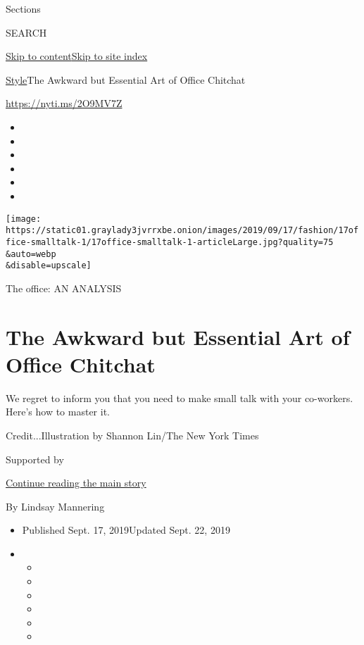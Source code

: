 Sections

SEARCH

\protect\hyperlink{site-content}{Skip to
content}\protect\hyperlink{site-index}{Skip to site index}

\href{/section/style}{Style}\textbar{}The Awkward but Essential Art of
Office Chitchat

\url{https://nyti.ms/2O9MV7Z}

\begin{itemize}
\item
\item
\item
\item
\item
\item
\end{itemize}

\texttt{[image: https://static01.graylady3jvrrxbe.onion/images/2019/09/17/fashion/17office-smalltalk-1/17office-smalltalk-1-articleLarge.jpg?quality=75\\\&auto=webp\\\&disable=upscale]}

The office: AN ANALYSIS

\hypertarget{the-awkward-but-essential-art-of-office-chitchat}{%
\section{The Awkward but Essential Art of Office
Chitchat}\label{the-awkward-but-essential-art-of-office-chitchat}}

We regret to inform you that you need to make small talk with your
co-workers. Here's how to master it.

Credit...Illustration by Shannon Lin/The New York Times

Supported by

\protect\hyperlink{after-sponsor}{Continue reading the main story}

By Lindsay Mannering

\begin{itemize}
\item
  Published Sept. 17, 2019Updated Sept. 22, 2019
\item
  \begin{itemize}
  \item
  \item
  \item
  \item
  \item
  \item
  \end{itemize}
\end{itemize}

